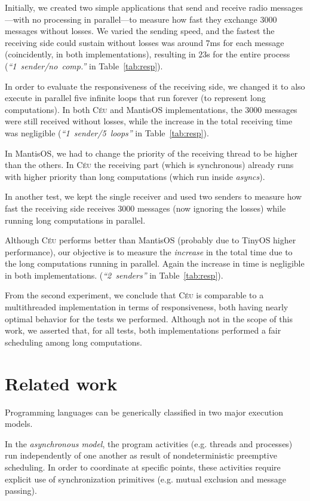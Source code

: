 \documentclass[11pt,a4paper]{article}
\newcommand{\2}{\;\;}
\newcommand{\5}{\;\;\;\;\;}
\newcommand{\CEU}{\textsc{C\'{e}u}}
\begin{document}
Initially, we created two simple applications that send and receive radio 
messages---with no processing in parallel---to measure how fast they exchange 
$3000$ messages without losses.
We varied the sending speed, and the fastest the receiving side could sustain 
without losses was around $7$ms for each message (coincidently, in both 
implementations), resulting in $23$s for the entire process 
(\emph{``1~sender/no~comp.''} in Table~\ref{tab:resp}).

In order to evaluate the responsiveness of the receiving side, we changed it to 
also execute in parallel five infinite loops that run forever (to represent 
long computations).
In both \CEU{} and MantisOS implementations, the $3000$ messages were still 
received without losses, while the increase in the total receiving time was 
negligible
(\emph{``1~sender/5~loops''} in Table~\ref{tab:resp}).

In MantisOS, we had to change the priority of the receiving thread to be higher 
than the others.
In \CEU{} the receiving part (which is synchronous) already runs with higher 
priority than long computations (which run inside \emph{asyncs}).

In another test, we kept the single receiver and used two senders to measure 
how fast the receiving side receives $3000$ messages (now ignoring the losses) 
while running long computations in parallel.

Although \CEU{} performs better than MantisOS (probably due to TinyOS higher 
performance), our objective is to measure the \emph{increase} in the total time 
due to the long computations running in parallel.
Again the increase in time is negligible in both implementations.
(\emph{``2~senders''} in Table~\ref{tab:resp}).

From the second experiment, we conclude that \CEU{} is comparable to a 
multithreaded implementation in terms of responsiveness, both having nearly 
optimal behavior for the tests we performed.
Although not in the scope of this work, we asserted that, for all tests, both 
implementations performed a fair scheduling among long computations.

\section{Related work}
\label{sec:related}

Programming languages can be generically classified in two major execution 
models.

In the \emph{asynchronous model}, the program activities (e.g. threads and 
processes) run independently of one another as result of nondeterministic 
preemptive scheduling.
In order to coordinate at specific points, these activities require explicit 
use of synchronization primitives (e.g. mutual exclusion and message passing).
\end{document}
